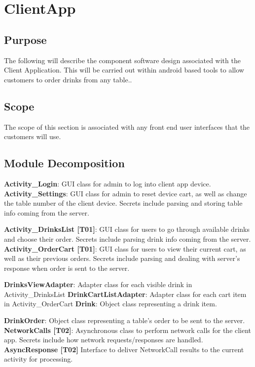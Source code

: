 \documentclass [10pt]{article}
\begin{document}

\section {ClientApp}

\subsection{Purpose}
The following will describe the component software design associated with the Client Application. This will be carried out within android based tools to allow customers to order drinks from any table..

\subsection{Scope}
The scope of this section is associated with any front end user interfaces that the customers will use.

\subsection{Module Decomposition}

\textbf{Activity\_Login}: GUI class for admin to log into client app device.
\textbf{Activity\_Settings}: GUI class for admin to reset device cart, as well as change the table number of the client device. Secrets include parsing and storing table info coming from the server.

\textbf{Activity\_DrinksList [T01]}: GUI class for users to go through available drinks and choose their order. Secrets include parsing drink info coming from the server.
\textbf{Activity\_OrderCart [T01]}: GUI class for users to view their current cart, as well as their previous orders. Secrets include parsing and dealing with server’s response when order is sent to the server.

\textbf{DrinksViewAdapter}: Adapter class for each visible drink in Activity\_DrinksList
\textbf{DrinkCartListAdapter}: Adapter class for each cart item in Activity\_OrderCart
\textbf{Drink}: Object class representing a drink item.

\textbf{DrinkOrder}: Object class representing a table’s order to be sent to the server. 
\textbf{NetworkCalls [T02]}: Asynchronous class to perform network calls for the client app. Secrets include how network requests/responses are handled.
\textbf{AsyncResponse [T02]} Interface to deliver NetworkCall results to the current activity for processing.
\end{document}
